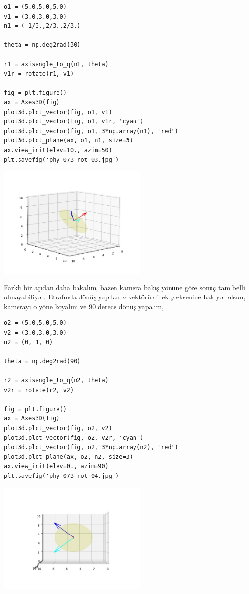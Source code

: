 \documentclass[12pt,fleqn]{article}\usepackage{../../common}
\begin{document}
\begin{verbatim}
o1 = (5.0,5.0,5.0)
v1 = (3.0,3.0,3.0)
n1 = (-1/3.,2/3.,2/3.)

theta = np.deg2rad(30)

r1 = axisangle_to_q(n1, theta)
v1r = rotate(r1, v1)

fig = plt.figure()
ax = Axes3D(fig)
plot3d.plot_vector(fig, o1, v1)
plot3d.plot_vector(fig, o1, v1r, 'cyan')
plot3d.plot_vector(fig, o1, 3*np.array(n1), 'red')
plot3d.plot_plane(ax, o1, n1, size=3)
ax.view_init(elev=10., azim=50)
plt.savefig('phy_073_rot_03.jpg')
\end{verbatim}

\includegraphics[width=20em]{phy_073_rot_03.jpg}

Farklı bir açıdan daha bakalım, bazen kamera bakış yönüne göre sonuç tam
belli olmayabiliyor. Etrafında dönüş yapılan $n$ vektörü direk $y$ eksenine
bakıyor olsun, kamerayı o yöne koyalım ve 90 derece dönüş yapalım,

\begin{verbatim}
o2 = (5.0,5.0,5.0)
v2 = (3.0,3.0,3.0)
n2 = (0, 1, 0)

theta = np.deg2rad(90)

r2 = axisangle_to_q(n2, theta)
v2r = rotate(r2, v2)

fig = plt.figure()
ax = Axes3D(fig)
plot3d.plot_vector(fig, o2, v2)
plot3d.plot_vector(fig, o2, v2r, 'cyan')
plot3d.plot_vector(fig, o2, 3*np.array(n2), 'red')
plot3d.plot_plane(ax, o2, n2, size=3)
ax.view_init(elev=0., azim=90)
plt.savefig('phy_073_rot_04.jpg')
\end{verbatim}

\includegraphics[width=20em]{phy_073_rot_04.jpg}
\end{document}
